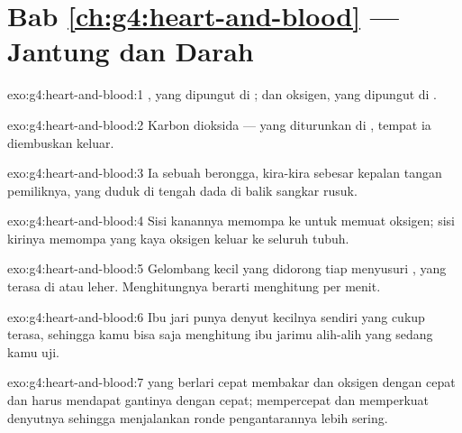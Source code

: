 \section*{Bab \ref{ch:g4:heart-and-blood} --- Jantung dan Darah}

\begin{solution}{exo:g4:heart-and-blood:1}
, yang dipungut di ; dan oksigen, yang dipungut di
.
\end{solution}

\begin{solution}{exo:g4:heart-and-blood:2}
Karbon dioksida --- yang diturunkan di , tempat ia
diembuskan keluar.
\end{solution}

\begin{solution}{exo:g4:heart-and-blood:3}
Ia sebuah  berongga, kira-kira sebesar kepalan tangan pemiliknya,
yang duduk di tengah dada di balik sangkar rusuk.
\end{solution}

\begin{solution}{exo:g4:heart-and-blood:4}
Sisi kanannya memompa  ke  untuk memuat oksigen; sisi
kirinya memompa  yang kaya oksigen keluar ke seluruh tubuh.
\end{solution}

\begin{solution}{exo:g4:heart-and-blood:5}
Gelombang kecil yang didorong tiap  menyusuri
, yang terasa di  atau leher. Menghitungnya
berarti menghitung  per menit.
\end{solution}

\begin{solution}{exo:g4:heart-and-blood:6}
Ibu jari punya denyut kecilnya sendiri yang cukup terasa, sehingga
kamu bisa saja menghitung ibu jarimu alih-alih  yang
sedang kamu uji.
\end{solution}

\begin{solution}{exo:g4:heart-and-blood:7}
 yang berlari cepat membakar  dan oksigen dengan cepat
dan harus mendapat gantinya dengan cepat;  mempercepat dan
memperkuat denyutnya sehingga  menjalankan ronde pengantarannya
lebih sering.
\end{solution}

